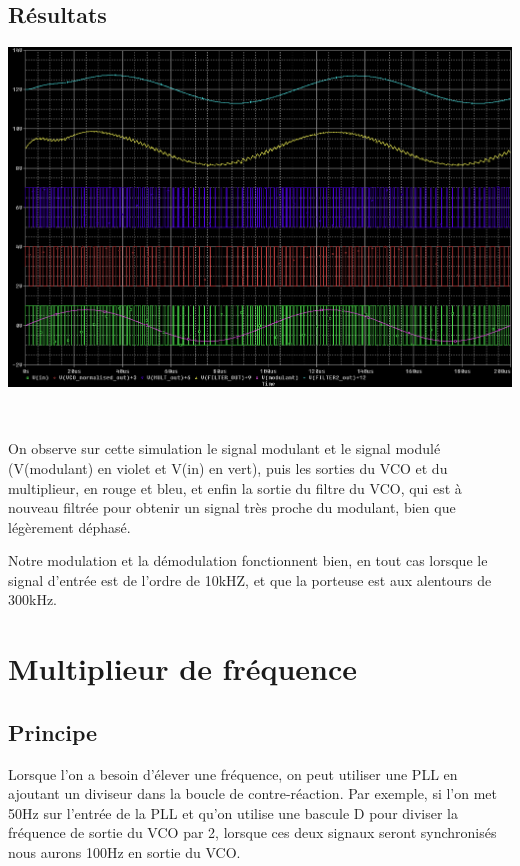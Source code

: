 \documentclass[11pt]{article}
\begin{document}
\subsection{Résultats}

\includegraphics[width=\linewidth]{modem_sim.png}

~

On observe sur cette simulation le signal modulant et le signal modulé (V(modulant) en violet et V(in) en vert), puis les sorties du VCO et du multiplieur, en rouge et bleu, et enfin la sortie du filtre du VCO, qui est à nouveau filtrée pour obtenir un signal très proche du modulant, bien que légèrement déphasé.

Notre modulation et la démodulation fonctionnent bien, en tout cas lorsque le signal d’entrée est de l’ordre de 10kHZ, et que la porteuse est aux alentours de 300kHz.

\section{Multiplieur de fréquence}

\subsection{Principe}

Lorsque l’on a besoin d’élever une fréquence, on peut utiliser une PLL en ajoutant un diviseur dans la boucle de contre-réaction. Par exemple, si l’on met 50Hz sur l’entrée de la PLL et qu’on utilise une bascule D pour diviser la fréquence de sortie du VCO par 2, lorsque ces deux signaux seront synchronisés nous aurons 100Hz en sortie du VCO.
\end{document}
